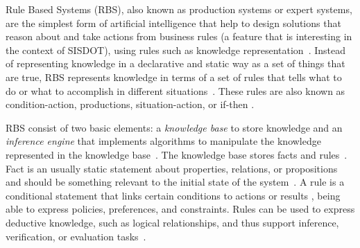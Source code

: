 
Rule Based Systems (RBS), also known as production systems or expert systems, are the 
simplest form of artificial intelligence that help to design solutions that reason about 
and take actions from business rules (a feature that is interesting in the context of SISDOT), using rules such as knowledge representation~\cite{grosan2011}. 
Instead of representing knowledge in a declarative and static way as a set of things that are true, 
RBS represents knowledge in terms of a set of rules that tells what to do or what to accomplish in different 
situations~\cite{grosan2011}. These rules are also known as condition-action, productions, situation-action, 
or if-then \cite{russell2010}.

RBS consist of two basic elements: a \emph{knowledge base} to store knowledge and an \emph{inference engine} that 
implements  algorithms to manipulate the knowledge represented in the knowledge base~\cite{grosan2011,lucas1991,gallacher1989}.
The knowledge base stores facts and rules~\cite{hayesRoth1985}. Fact is an usually static statement about properties, relations, 
or propositions~\cite{hayesRoth1985} and should be something relevant to the initial state of the system~\cite{grosan2011}. 
A rule is a conditional statement that links certain conditions to actions or results \cite{abraham2005}, being able to express 
policies, preferences, and constraints. Rules can be used to express deductive knowledge, 
such as logical relationships, and thus support inference, verification, or evaluation tasks~\cite{hayesRoth1985}.

